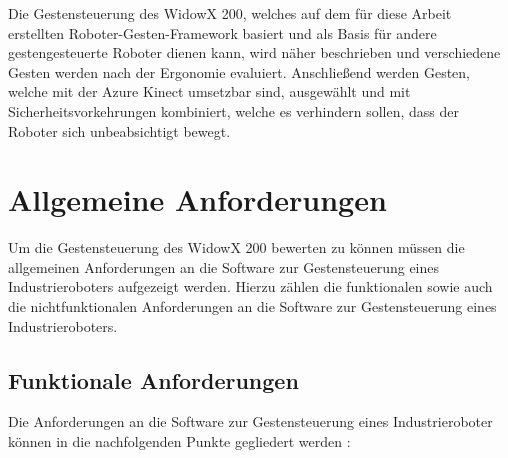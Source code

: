 Die Gestensteuerung des WidowX 200, welches auf dem für diese Arbeit erstellten Roboter-Gesten-Framework basiert und als Basis für andere gestengesteuerte Roboter dienen kann, wird näher beschrieben und verschiedene Gesten werden nach der Ergonomie evaluiert. Anschließend werden Gesten, welche mit der Azure Kinect umsetzbar sind, ausgewählt und mit Sicherheitsvorkehrungen kombiniert, welche es verhindern sollen, dass der Roboter sich unbeabsichtigt bewegt.


\section{Allgemeine Anforderungen}
Um die Gestensteuerung des WidowX 200 bewerten zu können müssen die allgemeinen Anforderungen an die Software zur Gestensteuerung eines Industrieroboters aufgezeigt werden. Hierzu zählen die funktionalen sowie auch die nichtfunktionalen Anforderungen an die Software zur Gestensteuerung eines Industrieroboters.

\subsection{Funktionale Anforderungen}
Die Anforderungen an die Software zur Gestensteuerung eines Industrieroboter können in die nachfolgenden Punkte gegliedert werden \cite{kircher_it_2006} \cite[2\psq]{brauer_gestenerkennung_nodate}:\\

